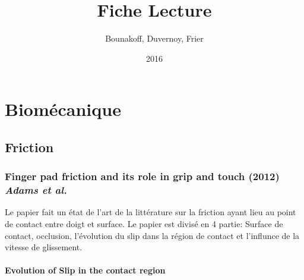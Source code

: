 \documentclass{article}
\title{Fiche Lecture}
\author{Bounakoff, Duvernoy, Frier}
\date{2016}
\begin{document}
	\maketitle
	\section{Biom\'{e}canique}
	\subsection{Friction}
	\subsubsection {Finger pad friction and its role in grip and touch (2012) \textit{Adams et al.} }
	Le papier fait un \'{e}tat de l'art de la litt\'{e}rature sur la friction ayant lieu au point de contact entre doigt et surface.
	Le papier est divis\'{e} en 4 partie: Surface de contact, occlusion, l'\'{e}volution du slip dans la r\'{e}gion de contact et l'influnce de la vitesse de glissement.

	\paragraph {Evolution of Slip in the contact region}
	
\end{document}
